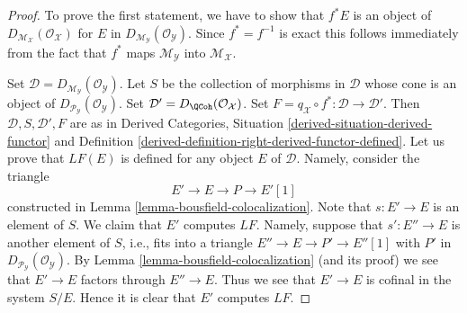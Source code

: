 \begin{proof}
To prove the first statement, we have to show that $f^*E$ is an object of
$D_{\mathcal{M}_\mathcal{X}}(\mathcal{O}_\mathcal{X})$ for
$E$ in $D_{\mathcal{M}_\mathcal{Y}}(\mathcal{O}_\mathcal{Y})$.
Since $f^* = f^{-1}$ is exact this follows immediately from the fact that
$f^*$ maps $\mathcal{M}_\mathcal{Y}$ into $\mathcal{M}_\mathcal{X}$.

\medskip\noindent
Set $\mathcal{D} = D_{\mathcal{M}_\mathcal{Y}}(\mathcal{O}_\mathcal{Y})$.
Let $S$ be the collection of morphisms in $\mathcal{D}$
whose cone is an object of
$D_{\mathcal{P}_\mathcal{Y}}(\mathcal{O}_\mathcal{Y})$.
Set $\mathcal{D}' = D_\QCoh(\mathcal{O}_\mathcal{X})$.
Set $F = q_\mathcal{X} \circ f^* : \mathcal{D} \to \mathcal{D}'$.
Then $\mathcal{D}, S, \mathcal{D}', F$ are as in
Derived Categories, Situation \ref{derived-situation-derived-functor} and
Definition \ref{derived-definition-right-derived-functor-defined}.
Let us prove that $LF(E)$ is defined for any object $E$ of $\mathcal{D}$.
Namely, consider the triangle
$$
E' \to E \to P \to E'[1]
$$
constructed in Lemma \ref{lemma-bousfield-colocalization}.
Note that $s : E' \to E$ is an element of $S$. We claim that $E'$ computes
$LF$. Namely, suppose that $s' : E'' \to E$ is another element of $S$, i.e.,
fits into a triangle $E'' \to E \to P' \to E''[1]$ with $P'$ in
$D_{\mathcal{P}_\mathcal{Y}}(\mathcal{O}_\mathcal{Y})$. By
Lemma \ref{lemma-bousfield-colocalization} (and its proof)
we see that $E' \to E$ factors through $E'' \to E$. Thus we see that
$E' \to E$ is cofinal in the system $S/E$. Hence it is clear that
$E'$ computes $LF$.


\end{proof}
